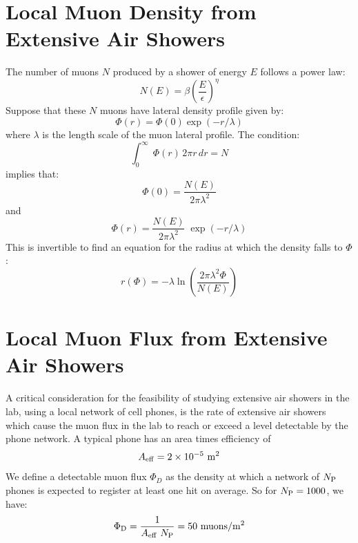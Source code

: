 \documentclass[12pt]{article}
\begin{document}
\section{Local Muon Density from Extensive Air Showers}

The number of muons $N$ produced by a shower of energy $E$ follows a power law:
\begin{equation}
N(E) = \beta \left( \frac{E}{\epsilon} \right)^{\eta}
\end{equation}
Suppose that these $N$ muons have lateral density profile given by:
$$\Phi(r) = \Phi(0) \exp(-r / \lambda)$$
where $\lambda$ is the length scale of the muon lateral profile.  The condition:
$$\int_0^\infty \; \Phi(r) \, 2 \pi r \, dr = N$$
implies that:
\begin{equation}
\Phi(0) = \frac{N(E)}{2 \pi \lambda^2}
\end{equation}
and
\begin{equation}
\Phi(r) =  \frac{N(E)}{2 \pi \lambda^2} \; \exp(-r / \lambda)
\end{equation}
This is invertible to find an equation for the radius at which the
density falls to $\Phi$:
\begin{equation}
r(\Phi) = -\lambda \ln \left( \frac{2 \pi \lambda^2 \Phi}{N(E)} \right)
\end{equation}


\section{Local Muon Flux from Extensive Air Showers}

A critical consideration for the feasibility of studying extensive air
showers in the lab, using a local network of cell phones, is the rate
of extensive air showers which cause the muon flux in the lab to reach
or exceed a level detectable by the phone network.  A typical phone
has an area times efficiency of
$$A_{\rm eff} = 2 \times 10^{-5}~\rm m^2$$
We define a detectable muon flux $\Phi_D$ as the density at which a
network of $N_{\rm P}$ phones is expected to register at least one hit
on average.  So for $N_{\rm P}=1000$, we have:
\begin{equation}
\Phi_{\rm D} = \frac{1}{A_{\rm eff}~N_{\rm P} } = 50~{\rm muons} / {\rm m^2}
\end{equation}
\end{document}

